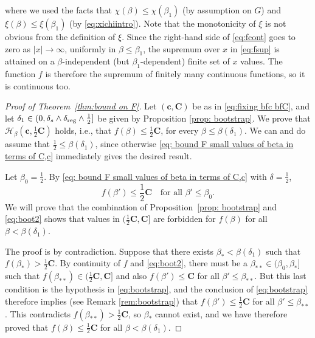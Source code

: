 \documentclass[11pt,a4paper]{article}
\numberwithin{equation}{section}
\theoremstyle{plain}
\theoremstyle{definition}
\newcommand\1{\mathds{1}}
\newcommand\bfc{\mathbf{c}}
\newcommand\bfC{\mathbf{C}}
\begin{document}
where we used the facts that $\chi(\beta)\leq \chi(\beta_1)$ (by assumption on $G$) and $\xi(\beta)\leq \xi(\beta_1)$ (by \eqref{eq:xichiintro}). Note that the monotonicity of
$\xi$ is not obvious from the definition of $\xi$.
Since the right-hand side of \eqref{eq:fcont}
goes to zero as $|x|\to\infty$, uniformly in
$\beta \le \beta_1$, the supremum over $x$ in \eqref{eq:fsup}
is attained on a
$\beta$-independent (but $\beta_1$-dependent) finite set of $x$ values.
The function $f$ is therefore the supremum of
finitely many continuous functions, so it is continuous too.

\begin{proof}[Proof of Theorem~\textup{\ref{thm:bound on F}}] Let $(\bfc,\bfC)$ be as in \eqref{eq:fixing bfc bfC},
and let $\delta_1\in (0, \delta_s\wedge\delta_{\textup{reg}}\wedge\tfrac{1}{2}]$ be given by Proposition \ref{prop: bootstrap}.
We prove that $\mathcal H_\beta(\bfc,\frac 12 \bfC)$ holds, i.e., that
$f(\beta)  \le \frac 12 \bfC$,
for every $\beta\leq \beta(\delta_1)$.
We can and do assume that $\frac 12  \le \beta(\delta_1)$, since otherwise
\eqref{eq: bound F small values of beta in terms of C,c} immediately gives
the desired result.

Let $\beta_0=\frac 12 $.  By
\eqref{eq: bound F small values of beta in terms of C,c}
with $\delta=\frac 12$,
\begin{equation}
\label{eq:boot2}
    f(\beta') \le \frac 12 \bfC \quad \text{for all $\beta'\le \beta_0$.}
\end{equation}
We will prove that the combination of Proposition~\ref{prop: bootstrap}
and \eqref{eq:boot2} shows that values in $(\frac 12 \bfC, \bfC]$ are forbidden
for $f(\beta)$ for all $\beta <\beta(\delta_1)$.

The proof is by contradiction.
Suppose that there exists $\beta_* < \beta(\delta_1)$ such
that $f(\beta_*) > \frac 12 \bfC$.  By continuity of $f$
and \eqref{eq:boot2}, there must be
a $\beta_{**} \in (\beta_0,\beta_*]$ such that $f(\beta_{**})
\in (\frac 12 \bfC,\bfC]$ and also $f(\beta')\le \bfC$ for all
$\beta' \le \beta_{**}$.
But this last condition is the hypothesis in \eqref{eq:bootstrap}, and
the conclusion of \eqref{eq:bootstrap} therefore implies (see Remark \ref{rem:bootstrap}) that
$f(\beta')\le \frac 12 \bfC$ for all $\beta' \le \beta_{**}$.
This contradicts $f(\beta_{**})> \frac 12 \bfC$, so
$\beta_*$ cannot exist, and we have therefore proved that $f(\beta)\le \frac 12 \bfC$
for all $\beta < \beta(\delta_1)$.


\end{proof}
\end{document}
